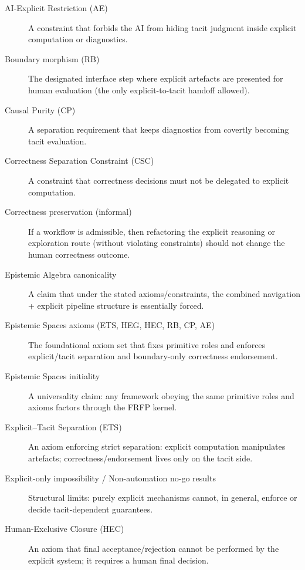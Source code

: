 \begin{description}

\item[AI-Explicit Restriction (AE)] A constraint that forbids the AI from hiding tacit judgment inside explicit computation or diagnostics.

\item[Boundary morphism (RB)] The designated interface step where explicit artefacts are presented for human evaluation (the only explicit-to-tacit handoff allowed).

\item[Causal Purity (CP)] A separation requirement that keeps diagnostics from covertly becoming tacit evaluation.

\item[Correctness Separation Constraint (CSC)] A constraint that correctness decisions must not be delegated to explicit computation.

\item[Correctness preservation (informal)] If a workflow is admissible, then refactoring the explicit reasoning or exploration route (without violating constraints) should not change the human correctness outcome.

\item[Epistemic Algebra canonicality] A claim that under the stated axioms/constraints, the combined navigation + explicit pipeline structure is essentially forced.

\item[Epistemic Spaces axioms (ETS, HEG, HEC, RB, CP, AE)] The foundational axiom set that fixes primitive roles and enforces explicit/tacit separation and boundary-only correctness endorsement.

\item[Epistemic Spaces initiality] A universality claim: any framework obeying the same primitive roles and axioms factors through the FRFP kernel.

\item[Explicit--Tacit Separation (ETS)] An axiom enforcing strict separation: explicit computation manipulates artefacts; correctness/endorsement lives only on the tacit side.

\item[Explicit-only impossibility / Non-automation no-go results] Structural limits: purely explicit mechanisms cannot, in general, enforce or decide tacit-dependent guarantees.

\item[Human-Exclusive Closure (HEC)] An axiom that final acceptance/rejection cannot be performed by the explicit system; it requires a human final decision.


\end{description}
